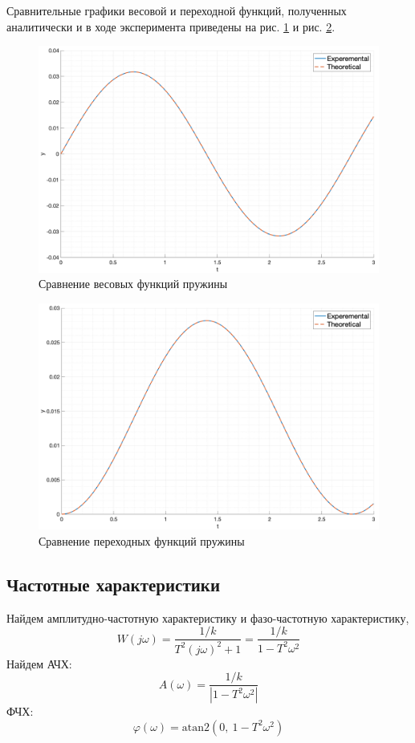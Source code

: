 Сравнительные графики весовой и переходной функций, полученных аналитически и в ходе эксперимента  приведены на рис. \ref{fig:task4_impulse_response_cmp} и рис. \ref{fig:task4_step_response_cmp}.
\begin{figure}[ht!]
    \centering
    \includegraphics[width=\textwidth]{media/plots/task4_impulse_response_cmp.png}
    \caption{Сравнение весовых функций пружины}
    \label{fig:task4_impulse_response_cmp}
\end{figure}
\begin{figure}[ht!]
    \centering
    \includegraphics[width=\textwidth]{media/plots/task4_step_response_cmp.png}
    \caption{Сравнение переходных функций пружины}
    \label{fig:task4_step_response_cmp}
\end{figure}

\FloatBarrier
\subsection{Частотные характеристики}
\noindent Найдем амплитудно-частотную характеристику и фазо-частотную характеристику,
\begin{equation}
    W(j\omega) = \frac{1/k}{T^2(j\omega)^2 + 1} = \frac{1/k}{1 - T^2\omega^2}
\end{equation}
Найдем АЧХ:
\begin{equation}
    A(\omega) = \frac{1/k}{|1 - T^2\omega^2|}
\end{equation}
ФЧХ:
\begin{equation}
    \varphi(\omega) = \text{atan2}\left(0,~1 - T^2\omega^2\right)
\end{equation}

